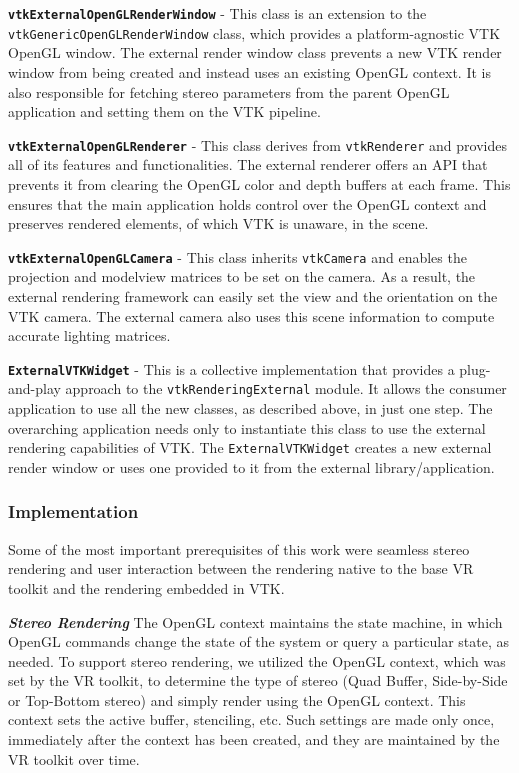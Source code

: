 \textbf{\texttt{vtkExternalOpenGLRenderWindow}} - This class is an extension to
the \texttt{vtkGenericOpenGLRenderWindow} class, which provides a
platform-agnostic VTK OpenGL window.
The external render window class prevents a new VTK render window from being
created and instead uses an existing OpenGL context.
It is also responsible for fetching stereo parameters from the parent OpenGL
application and setting them on the VTK pipeline.

\textbf{\texttt{vtkExternalOpenGLRenderer}} - This class derives from
\texttt{vtkRenderer} and provides all of its features and functionalities. The
external renderer offers an API that prevents it from clearing the OpenGL color
and depth buffers at each frame. This ensures that the main application holds
control over the OpenGL context and preserves rendered elements, of which VTK is unaware, in the scene.

\textbf{\texttt{vtkExternalOpenGLCamera}} - This class inherits
\texttt{vtkCamera} and enables the projection and modelview
matrices to be set on the camera. As a result, the external rendering framework can easily
set the view and the orientation on the VTK camera. The external camera also uses
this scene information to compute accurate lighting matrices.

\textbf{\texttt{ExternalVTKWidget}} - This is a collective implementation that
provides a plug-and-play approach to the \texttt{vtkRenderingExternal} module.
It allows the consumer application to use all the new classes, as described above,
in just one step. The overarching application needs only to instantiate this
class to use the external rendering capabilities of VTK. The
\texttt{ExternalVTKWidget} creates a new external render window or uses one
provided to it from the external library/application.

\subsubsection{Implementation}

Some of the most important prerequisites of this work were seamless stereo
rendering and user interaction between the rendering native to the base VR toolkit and the rendering embedded in VTK. 

\textbf{\textit{Stereo Rendering}} The OpenGL context maintains the state machine, in which OpenGL commands change the state of the system or query a particular state, as needed.
To support stereo rendering, we utilized the OpenGL context, which was set by the VR toolkit, to determine the type of stereo (Quad Buffer, Side-by-Side or Top-Bottom stereo) and simply render using the OpenGL context. This context sets the active buffer, stenciling, etc.
Such settings are made only once, immediately after the context has been created, and they are maintained by the VR toolkit over time. 


